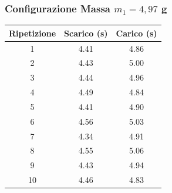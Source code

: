 \documentclass[a4paper,12pt]{article}
\begin{document}
\subsubsection*{Configurazione Massa $m_1 = 4,97$ g}
\noindent
\begin{minipage}[c]{0.45\textwidth}
\centering
\small
\begin{tabular}{ccc}
\hline
\textbf{Ripetizione} & \textbf{Scarico (s)} & \textbf{Carico (s)} \\ \hline
1  & 4.41 & 4.86 \\
2  & 4.43 & 5.00 \\
3  & 4.44 & 4.96 \\
4  & 4.49 & 4.84 \\
5  & 4.41 & 4.90 \\
6  & 4.56 & 5.03 \\
7  & 4.34 & 4.91 \\
8  & 4.55 & 5.06 \\
9  & 4.43 & 4.94 \\
10 & 4.46 & 4.83 \\ \hline
\end{tabular}
\label{tab:dinamica_massa1}
\end{minipage}
\hfill
\begin{minipage}[c]{0.50\textwidth}
\centering
\label{fig:isto_massa1}
\end{minipage}

\vspace{0.8cm} %

\end{document}
